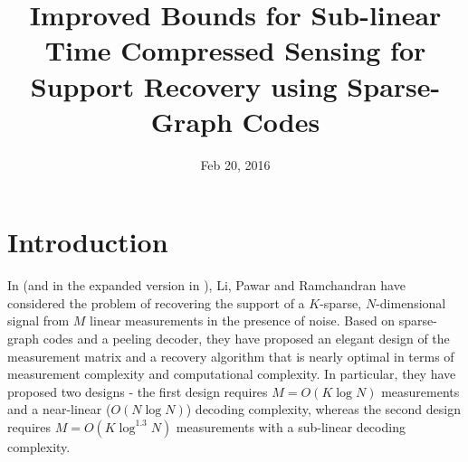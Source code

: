 \documentclass[journal,draft,onecolumn]{IEEEtran}
\begin{document}
\IEEEoverridecommandlockouts
\newtheorem{theorem}{Theorem}
\newtheorem{lemma}[theorem]{Lemma}
\newtheorem{remark}[theorem]{Remark}
\newtheorem{definition}[theorem]{Definition}
\newtheorem{corollary}[theorem]{Corollary}
\newcommand{\mbf}[1]{\mathbf{#1}}

\title{\LARGE{Improved Bounds for Sub-linear Time Compressed Sensing for Support Recovery using Sparse-Graph Codes}}
\author{
}
\date{Feb 20, 2016}
\maketitle

\pagestyle{empty}

\section{Introduction}
In \cite{li2015subisit} (and in the expanded version in \cite{li2015subdraft}), Li, Pawar and Ramchandran have considered the problem of recovering the support of a $K$-sparse, $N$-dimensional signal from $M$ linear measurements in the presence of noise. Based on sparse-graph codes and a peeling decoder, they have proposed an elegant design of the measurement matrix and a recovery algorithm that is nearly optimal in terms of measurement complexity and computational complexity. In particular, they have proposed two designs - the first design requires $M = O(K \log N)$ measurements and a near-linear ($O(N \log N)$) decoding complexity, whereas the second design requires $M = O(K \log^{1.3} N)$ measurements with a sub-linear decoding complexity.
\end{document}
